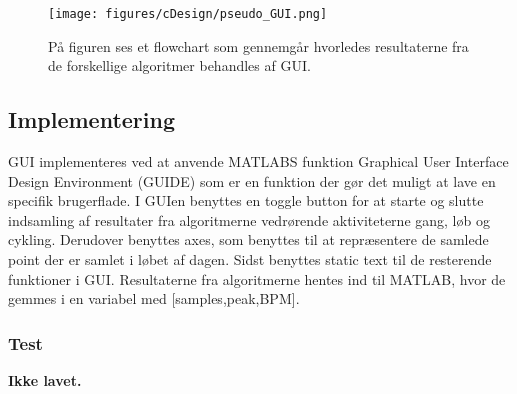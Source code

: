 \begin{figure}[H]
	\centering
	\texttt{[image: figures/cDesign/pseudo\_GUI.png]}
	\caption{På figuren ses et flowchart som gennemgår hvorledes resultaterne fra de forskellige algoritmer behandles af GUI.}
	\label{fig:GUI}
\end{figure}

\subsection{Implementering}
GUI implementeres ved at anvende MATLABS funktion Graphical User Interface Design Environment (GUIDE) som er en funktion der gør det muligt at lave en specifik brugerflade. I GUIen benyttes en toggle button for at starte og slutte indsamling af resultater fra algoritmerne vedrørende aktiviteterne gang, løb og cykling. Derudover benyttes axes, som benyttes til at repræsentere de samlede point der er samlet i løbet af dagen. Sidst benyttes static text til de resterende funktioner i GUI. \newline
Resultaterne fra algoritmerne hentes ind til MATLAB, hvor de gemmes i en variabel med [samples,peak,BPM].

\subsubsection{Test}
\textbf{Ikke lavet.}